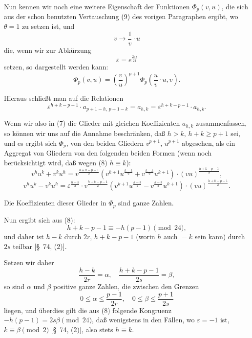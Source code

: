 \documentclass[12pt,a4paper]{article}
\theoremstyle{definition}
\begin{document}
Nun kennen wir noch eine weitere Eigenschaft der Funktionen $\Phi_p(v, u)$, die sich aus der schon benutzten Vertauschung (9) des vorigen Paragraphen ergibt, wo $\theta = 1$ zu setzen ist, und
\[
v \to \frac{1}{v} \cdot u
\]
die, wenn wir zur Abkürzung
\[
\varepsilon = e^{\frac{2\pi i}{24}}
\]
setzen, so dargestellt werden kann:
\begin{equation}\label{eq:74-9}
\Phi_p(v, u) = \left(\frac{v}{u}\right)^{p+1} \Phi_p\left(\frac{u}{v} \cdot u, v\right).
\end{equation}

Hieraus schließt man auf die Relationen
\begin{equation}\label{eq:74-10}
\varepsilon^{h+k-p-1} \cdot a_{p+1-h,\,p+1-k} = a_{h,k} = \varepsilon^{h+k-p-1} \cdot a_{h,k}.
\end{equation}

Wenn wir also in (7) die Glieder mit gleichen Koeffizienten $a_{h,k}$ zusammenfassen, so können wir uns auf die Annahme beschränken, daß $h > k$, $h + k \geq p + 1$ sei, und es ergibt sich $\Phi_p$, von den beiden Gliedern $v^{p+1}$, $u^{p+1}$ abgesehen, als ein Aggregat von Gliedern von den folgenden beiden Formen (wenn noch berücksichtigt wird, daß wegen (8) $h \equiv k$):
\begin{equation}\label{eq:74-11}
v^h u^k + v^k u^h = v^{\frac{h+k-p-1}{2}} (v^{k+1} u^{\frac{h-k}{2}} + v^{\frac{h-k}{2}} u^{k+1}) \cdot (vu)^{\frac{h+k-p-1}{2}},
\end{equation}
\begin{equation}\label{eq:74-12}
v^h u^k - v^k u^h = \varepsilon^{\frac{h-k}{2}} \cdot v^{\frac{h+k-p-1}{2}} (v^{k+1} u^{\frac{h-k}{2}} - v^{\frac{h-k}{2}} u^{k+1}) \cdot (vu)^{\frac{h+k-p-1}{2}}.
\end{equation}

Die Koeffizienten dieser Glieder in $\Phi_p$ sind ganze Zahlen.

Nun ergibt sich aus (8):
\[
h + k - p - 1 \equiv -h(p-1) \pmod{24},
\]
und daher ist $h - k$ durch $2r$, $h + k - p - 1$ (worin $h$ auch $= k$ sein kann) durch $2s$ teilbar [\S\ 74, (2)].

Setzen wir daher
\[
\frac{h - k}{2r} = \alpha, \quad \frac{h + k - p - 1}{2s} = \beta,
\]
so sind $\alpha$ und $\beta$ positive ganze Zahlen, die zwischen den Grenzen
\begin{equation}\label{eq:74-13}
0 \leq \alpha \leq \frac{p-1}{2r}, \quad 0 \leq \beta \leq \frac{p+1}{2s}
\end{equation}
liegen, und überdies gilt die aus (8) folgende Kongruenz $-h(p-1) = 2s\beta \pmod{24}$, daß wenigstens in den Fällen, wo $\varepsilon = -1$ ist, $k \equiv \beta \pmod{2}$ [\S\ 74, (2)], also stets $h \equiv k$.
\end{document}
